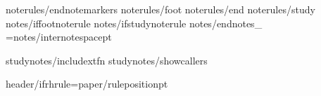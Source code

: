 {noterules/endnotemarkers}
{noterules/foot}
{noterules/end}
{noterules/study}
{notes/iffootnoterule}\def\FootNoteRuleThickness{{0pt}}
{notes/ifstudynoterule}\def\StudyNoteRuleThickness{{0pt}}
{notes/endnotes_}\def\EndNoteRuleThickness{{0pt}}
\InterNoteSpace={notes/internotespace}pt

{studynotes/includextfn}
{studynotes/showcallers}

\def\HeaderPosition{{{paper/headerposition}}}
\def\FooterPosition{{{paper/footerposition}}}
{header/ifrhrule}\RHruleposition={paper/ruleposition}pt
\def\RangeSeparator{{\kern.1em{rangesep_}\kern.1em}} %
\def\ChapterVerseSeparator{{\kern.02em{chvssep_}\kern.02em}} %
\def\RangeChapSeparator{{\kern.1em{chaprangesep_}\kern.1em}}
\def\BookChapSeparator{{{bksep_}}}

\def\RHevenleft{{{header/evenleft}}}
\def\RHevencenter{{{header/evencenter}}}
\def\RHevenright{{{header/evenright}}}

\def\RHoddleft{{{header/oddleft}}}
\def\RHoddcenter{{{header/oddcenter}}}
\def\RHoddright{{{header/oddright}}}

\def\RHnoVevenleft{{{header/noVevenleft}}}
\def\RHnoVevencenter{{{header/noVevencenter}}}
\def\RHnoVevenright{{{header/noVevenright}}}

\def\RHnoVoddleft{{{header/noVoddleft}}}
\def\RHnoVoddcenter{{{header/noVoddcenter}}}
\def\RHnoVoddright{{{header/noVoddright}}}


\def\RFoddcenter{{{footer/oddcenter}}}
\def\RFevencenter{{{footer/oddcenter}}}
\def\RFtitleevencenter{{{footer/titleevencenter}}}
\def\RFtitleoddcenter{{{footer/titleoddcenter}}}
\def\RFnoVoddcenter{{{footer/oddcenter}}}
\def\RFnoVevencenter{{{footer/oddcenter}}}

  
